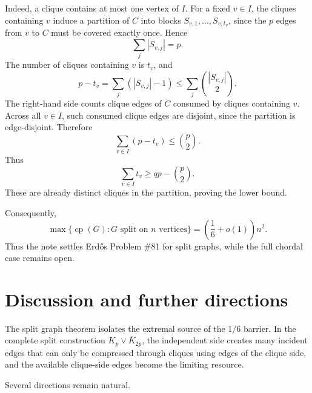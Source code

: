 \documentclass[11pt]{article}
\newcommand{\cp}{\operatorname{cp}}
\begin{document}
Indeed, a clique contains at most one vertex of \(I\). For a fixed \(v\in I\), the cliques containing \(v\) induce a partition of \(C\) into blocks \(S_{v,1},\ldots,S_{v,t_v}\), since the \(p\) edges from \(v\) to \(C\) must be covered exactly once. Hence
\[
    \sum_j |S_{v,j}|=p.
\]
The number of cliques containing \(v\) is \(t_v\), and
\[
    p-t_v=\sum_j (|S_{v,j}|-1)
    \le
    \sum_j \binom{|S_{v,j}|}{2}.
\]
The right-hand side counts clique edges of \(C\) consumed by cliques containing \(v\). Across all \(v\in I\), such consumed clique edges are disjoint, since the partition is edge-disjoint. Therefore
\[
    \sum_{v\in I}(p-t_v)\le \binom{p}{2}.
\]
Thus
\[
    \sum_{v\in I}t_v
    \ge
    qp-\binom{p}{2}.
\]
These are already distinct cliques in the partition, proving the lower bound.

Consequently,
\[
    \max\{\cp(G):G\text{ split on }n\text{ vertices}\}
    =
    \left(\frac16+o(1)\right)n^2.
\]
Thus the note settles Erdős Problem \#81 for split graphs, while the full chordal case remains open.



\section{Discussion and further directions}\label{sec:future}

The split graph theorem isolates the extremal source of the \(1/6\) barrier. In the complete split construction \(K_p\vee\overline{K}_{2p}\), the independent side creates many incident edges that can only be compressed through cliques using edges of the clique side, and the available clique-side edges become the limiting resource.

Several directions remain natural.
\end{document}
